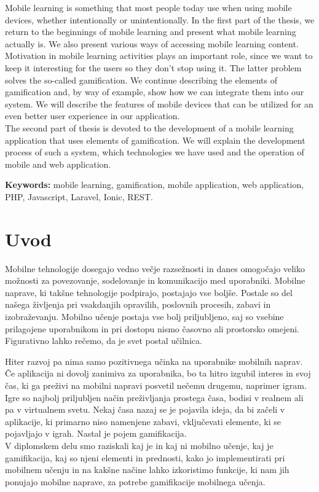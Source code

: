 \documentclass[a4paper, 12pt]{book}
\newcommand{\tkeywordsEn}{mobile learning, gamification, mobile application, web application, PHP, Javascript, Laravel, Ionic, REST}
\newcommand{\clearemptydoublepage}{\newpage{\pagestyle{empty}\cleardoublepage}}
\begin{document}
\noindent Mobile learning is something that most people today use when using mobile devices, whether intentionally or unintentionally. In the first part of the thesis, we return to the beginnings of mobile learning and present what mobile learning actually is. We also present various ways of accessing mobile learning content.\\Motivation in mobile learning activities plays an important role, since we want to keep it interesting for the users so they don't stop using it. The latter problem solves the so-called gamification. We continue describing the elements of gamification and, by way of example, show how we can integrate them into our system. We will describe the features of mobile devices that can be utilized for an even better user experience in our application.\\The second part of thesis is devoted to the development of a mobile learning application that uses elements of gamification. We will explain the development process of such a system, which technologies we have used and the operation of mobile and web application.
\bigskip

\noindent\textbf{Keywords:} \tkeywordsEn.
\clearemptydoublepage

\mainmatter
\setcounter{page}{1}
\pagestyle{fancy}

\chapter{Uvod}
\label{ch1}
Mobilne tehnologije dosegajo vedno večje razsežnosti in danes omogočajo veliko možnosti za povezovanje, sodelovanje in komunikacijo med uporabniki. Mobilne naprave, ki takšne tehnologije podpirajo, postajajo vse boljše. Postale so del našega življenja pri vsakdanjih opravilih, poslovnih procesih, zabavi in izobraževanju. Mobilno učenje postaja vse bolj priljubljeno, saj so vsebine prilagojene uporabnikom in pri dostopu nismo časovno ali prostorsko omejeni. Figurativno lahko rečemo, da je svet postal učilnica.

Hiter razvoj pa nima samo pozitivnega učinka na uporabnike mobilnih naprav. Če aplikacija ni dovolj zanimiva za uporabnika, bo ta hitro izgubil interes in svoj čas, ki ga preživi na mobilni napravi posvetil nečemu drugemu, naprimer igram. Igre so najbolj priljubljen način preživljanja prostega časa, bodisi v realnem ali pa v virtualnem svetu. Nekaj časa nazaj se je pojavila ideja, da bi začeli v aplikacije, ki primarno niso namenjene zabavi, vključevati elemente, ki se pojavljajo v igrah. Nastal je pojem gamifikacija.\\ V diplomskem delu smo raziskali kaj je in kaj ni mobilno učenje, kaj je gamifikacija, kaj so njeni elementi in prednosti, kako jo implementirati pri mobilnem učenju in na kakšne načine lahko izkoristimo funkcije, ki nam jih ponujajo mobilne naprave, za potrebe gamifikacije mobilnega učenja. 
\end{document}
